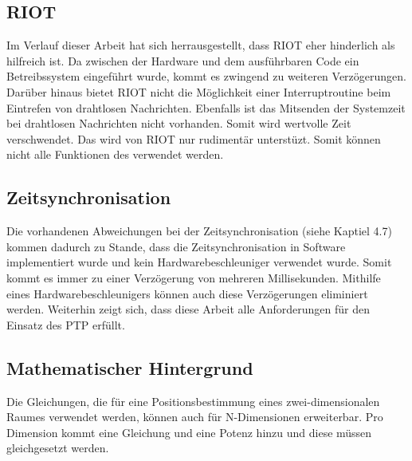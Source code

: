\subsection{RIOT}
Im Verlauf dieser Arbeit hat sich herrausgestellt, dass RIOT eher hinderlich als hilfreich ist. Da zwischen der Hardware und dem ausführbaren Code ein Betreibssystem eingeführt wurde, kommt es zwingend zu weiteren Verzögerungen. Darüber hinaus bietet RIOT nicht die Möglichkeit einer Interruptroutine beim Eintrefen von drahtlosen Nachrichten. Ebenfalls ist das Mitsenden der Systemzeit bei drahtlosen Nachrichten nicht vorhanden. Somit wird wertvolle Zeit verschwendet. Das \board \platz wird von RIOT nur rudimentär unterstüzt. Somit können nicht alle Funktionen des \board \platz verwendet werden.

\subsection{Zeitsynchronisation}
Die vorhandenen Abweichungen bei der Zeitsynchronisation (siehe Kaptiel 4.7) kommen dadurch zu Stande, dass die Zeitsynchronisation in Software implementiert wurde und kein Hardwarebeschleuniger verwendet wurde. Somit kommt es immer zu einer Verzögerung von mehreren Millisekunden. Mithilfe eines Hardwarebeschleunigers können auch diese Verzögerungen eliminiert werden. Weiterhin zeigt sich, dass diese Arbeit alle Anforderungen für den Einsatz des PTP erfüllt.

\subsection{Mathematischer Hintergrund}
Die Gleichungen, die für eine Positionsbestimmung eines zwei-dimensionalen Raumes verwendet werden, können auch für \si{N}-Dimensionen erweiterbar. Pro Dimension kommt eine Gleichung und eine Potenz hinzu und diese müssen gleichgesetzt werden.















